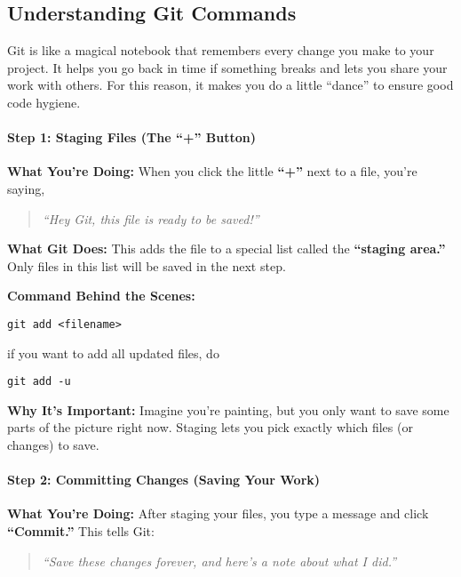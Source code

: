 \documentclass{ximera}
\begin{document}
\begin{multicols}{2}
    \section{Understanding Git Commands}

    Git is like a magical notebook that remembers every change you make to your
    project. It helps you go back in time if something breaks and lets you share
    your work with others. For this reason, it makes you do a little ``dance'' to ensure good code hygiene.

    \paragraph{Step 1: Staging Files (The ``+'' Button)}

    \textbf{What You're Doing:}
    When you click the little \textbf{``+''} next to a file, you're saying,
    \begin{quote}
        \emph{``Hey Git, this file is ready to be saved!''}
    \end{quote}

    \textbf{What Git Does:}
    This adds the file to a special list called the \textbf{``staging area.''} Only
    files in this list will be saved in the next step.

    \textbf{Command Behind the Scenes:}
\begin{verbatim}
git add <filename>
\end{verbatim}
if you want to add all updated files, do
\begin{verbatim}
git add -u
\end{verbatim}


    \textbf{Why It's Important:}
    Imagine you're painting, but you only want to save some parts of the picture
    right now. Staging lets you pick exactly which files (or changes) to save.

    \paragraph{Step 2: Committing Changes (Saving Your Work)}

    \textbf{What You're Doing:}
    After staging your files, you type a message and click \textbf{``Commit.''}
    This tells Git:
    \begin{quote}
        \emph{``Save these changes forever, and here's a note about what I did.''}
    \end{quote}


\end{multicols}
\end{document}
